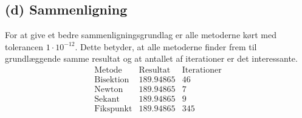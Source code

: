 \subsection*{(d) Sammenligning}
% 
For at give et bedre sammenligningsgrundlag er alle metoderne kørt med tolerancen $1\cdot10^{-12}$.
Dette betyder, at alle metoderne finder frem til grundlæggende samme resultat og at antallet af iterationer er det interessante.
%
$$\begin{array}{l|c|c}
\text{Metode} & \text{Resultat} & \text{Iterationer}\\
\hline
\text{Bisektion}	& 189.94865 & 46\\
\text{Newton}		& 189.94865 & 7\\
\text{Sekant}		& 189.94865 & 9\\
\text{Fikspunkt}	& 189.94865 & 345
\end{array}$$